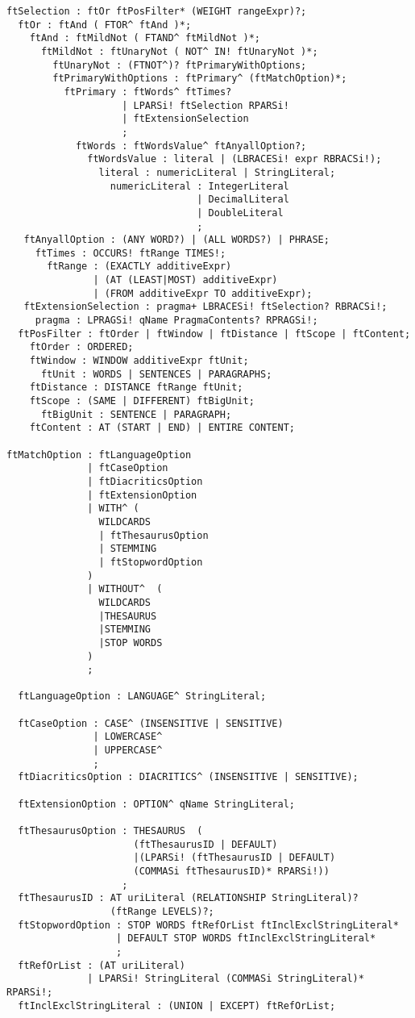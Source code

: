\begin{Verbatim}[frame=none, fontsize=\footnotesize]
ftSelection : ftOr ftPosFilter* (WEIGHT rangeExpr)?;
  ftOr : ftAnd ( FTOR^ ftAnd )*;
    ftAnd : ftMildNot ( FTAND^ ftMildNot )*;
      ftMildNot : ftUnaryNot ( NOT^ IN! ftUnaryNot )*;
        ftUnaryNot : (FTNOT^)? ftPrimaryWithOptions;
        ftPrimaryWithOptions : ftPrimary^ (ftMatchOption)*;
          ftPrimary : ftWords^ ftTimes? 
                    | LPARSi! ftSelection RPARSi! 
                    | ftExtensionSelection
                    ;
            ftWords : ftWordsValue^ ftAnyallOption?;
              ftWordsValue : literal | (LBRACESi! expr RBRACSi!);
                literal : numericLiteral | StringLiteral;
                  numericLiteral : IntegerLiteral 
                                 | DecimalLiteral 
                                 | DoubleLiteral
                                 ;
   ftAnyallOption : (ANY WORD?) | (ALL WORDS?) | PHRASE;
     ftTimes : OCCURS! ftRange TIMES!;
       ftRange : (EXACTLY additiveExpr)
               | (AT (LEAST|MOST) additiveExpr)
               | (FROM additiveExpr TO additiveExpr);
   ftExtensionSelection : pragma+ LBRACESi! ftSelection? RBRACSi!;
     pragma : LPRAGSi! qName PragmaContents? RPRAGSi!;
  ftPosFilter : ftOrder | ftWindow | ftDistance | ftScope | ftContent;
    ftOrder : ORDERED;
    ftWindow : WINDOW additiveExpr ftUnit;
      ftUnit : WORDS | SENTENCES | PARAGRAPHS;
    ftDistance : DISTANCE ftRange ftUnit;
    ftScope : (SAME | DIFFERENT) ftBigUnit;
      ftBigUnit : SENTENCE | PARAGRAPH;
    ftContent : AT (START | END) | ENTIRE CONTENT;

ftMatchOption : ftLanguageOption
              | ftCaseOption
              | ftDiacriticsOption
              | ftExtensionOption
              | WITH^ (
                WILDCARDS
                | ftThesaurusOption
                | STEMMING
                | ftStopwordOption
              )
              | WITHOUT^  (
                WILDCARDS
                |THESAURUS
                |STEMMING
                |STOP WORDS
              )
              ;

  ftLanguageOption : LANGUAGE^ StringLiteral;

  ftCaseOption : CASE^ (INSENSITIVE | SENSITIVE)
               | LOWERCASE^
               | UPPERCASE^
               ;
  ftDiacriticsOption : DIACRITICS^ (INSENSITIVE | SENSITIVE);

  ftExtensionOption : OPTION^ qName StringLiteral;

  ftThesaurusOption : THESAURUS  (
                      (ftThesaurusID | DEFAULT)
                      |(LPARSi! (ftThesaurusID | DEFAULT) 
                      (COMMASi ftThesaurusID)* RPARSi!))
                    ;
  ftThesaurusID : AT uriLiteral (RELATIONSHIP StringLiteral)? 
                  (ftRange LEVELS)?;
  ftStopwordOption : STOP WORDS ftRefOrList ftInclExclStringLiteral*
                   | DEFAULT STOP WORDS ftInclExclStringLiteral*
                   ;
  ftRefOrList : (AT uriLiteral)
              | LPARSi! StringLiteral (COMMASi StringLiteral)* RPARSi!;
  ftInclExclStringLiteral : (UNION | EXCEPT) ftRefOrList;


\end{Verbatim}

